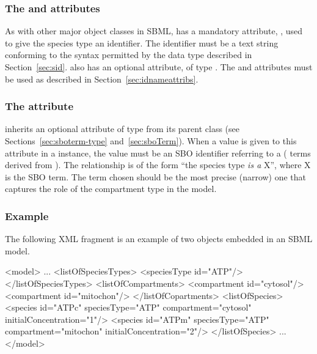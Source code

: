 
\subsubsection{The  and  attributes}

As with other major object classes in SBML, \SpeciesType has a
mandatory attribute, , used to give the species type an
identifier.  The identifier must be a text string conforming to
the syntax permitted by the  data type described in
Section~\ref{sec:sid}.  \SpeciesType also has an optional
 attribute, of type .  The 
and  attributes must be used as described in
Section~\ref{sec:idnameattribs}.


\subsubsection{The  attribute}
\label{sec:speciestype-sboterm}

\SpeciesType inherits an optional 
attribute of type  from its parent
class \SBase (see Sections~\ref{sec:sboterm-type}
and~\ref{sec:sboTerm}).  When a value is given to this
attribute in a \SpeciesType instance, the value must
be an SBO identifier referring to a  (\ie
terms derived from \sboparticipantphysical).  The relationship is
of the form ``the species type \emph{is a} X'', where X is the
SBO term.  The term chosen should be the most precise (narrow) one
that captures the role of the compartment type in the model.


\subsubsection{Example}

The following XML fragment is an example of two
\SpeciesType objects embedded in an SBML model.

\begin{example}
<model>
    ...
     <listOfSpeciesTypes>
         <speciesType id="ATP"/>
     </listOfSpeciesTypes>
     <listOfCompartments>
         <compartment id="cytosol"/>
         <compartment id="mitochon"/>
     </listOfCopartments>
     <listOfSpecies>
         <species id="ATPc" speciesType="ATP" compartment="cytosol"  initialConcentration="1"/>
         <species id="ATPm" speciesType="ATP" compartment="mitochon" initialConcentration="2"/>
     </listOfSpecies>
    ...
</model>
\end{example}


